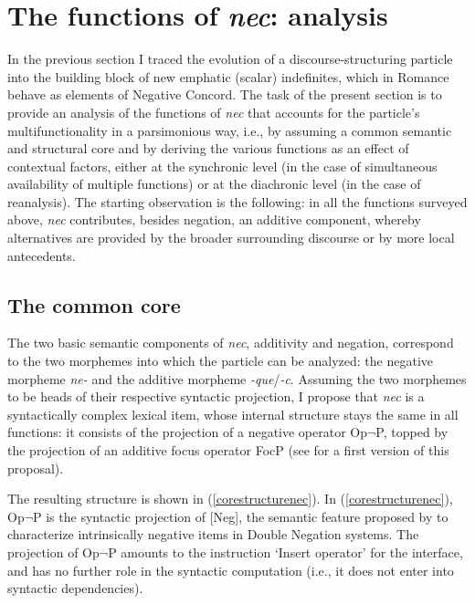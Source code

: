 \documentclass[output=paper,modfonts,nonflat,citecolor=brown,
showindex
]{langsci/langscibook}
\begin{document}
\section{The functions of {\emph{nec}}: analysis} \label{sectionanalysis}

In the previous section I traced the evolution of a discourse-structuring particle into the building block of new emphatic (scalar) indefinites, which in Romance behave as elements of Negative Concord. The task of the present section is to provide an analysis of the functions of {\emph{nec}} that accounts for the particle's multifunctionality in a parsimonious way, i.e., by assuming a common semantic and structural core and by deriving the various functions as an effect of contextual factors, either at the synchronic level (in the case of simultaneous availability of multiple functions) or at the diachronic level (in the case of reanalysis). The starting observation is the following: in all the functions surveyed above, {\emph{nec}} contributes, besides negation, an additive component, whereby alternatives are provided by the broader surrounding discourse or by more local antecedents. 

\subsection{The common core}

The two basic semantic components of {\emph{nec}}, additivity and negation, correspond to the two morphemes into which the particle can be analyzed: the negative morpheme {\emph{ne-}} and the additive morpheme {\emph{-que}}/{\emph{-c}}. Assuming the two morphemes to be heads of their respective syntactic projection, I propose that {\emph{nec}} is a syntactically complex lexical item, whose internal structure stays the same in all functions: it consists of the projection of a negative operator Op$\lnot$P, topped by the projection of an additive focus operator FocP (see \citealt[]{Gianollo17} for a first version of this proposal).

The resulting structure is shown in (\ref{corestructurenec}). In (\ref{corestructurenec}), Op$\lnot$P is the syntactic projection of [Neg], the semantic feature proposed by \citet{Zeijlstra04, Zeijlstra14} to characterize intrinsically negative items in Double Negation systems. The projection of Op$\lnot$P amounts to the instruction `Insert operator' for the interface, and has no further role in the syntactic computation (i.e., it does not enter into syntactic dependencies). 
\end{document}
